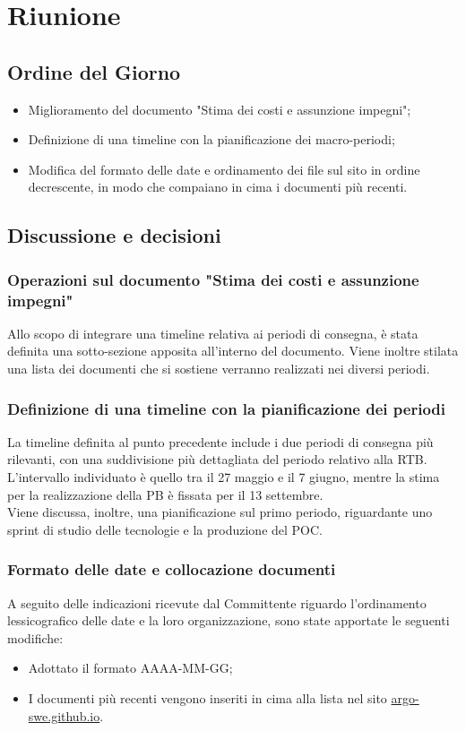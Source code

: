 \section{Riunione}
\subsection{Ordine del Giorno}
\begin{itemize}
	\item Miglioramento del documento "Stima dei costi e assunzione impegni";
	\item Definizione di una timeline con la pianificazione dei macro-periodi;
	\item Modifica del formato delle date e ordinamento dei file sul sito in ordine decrescente, in modo che compaiano in cima i documenti più recenti.
\end{itemize}

\subsection{Discussione e decisioni}

\subsubsection{Operazioni sul documento "Stima dei costi e assunzione impegni"}
Allo scopo di integrare una timeline relativa ai periodi di consegna, è stata definita una sotto-sezione apposita all’interno del documento. Viene inoltre stilata una lista dei documenti che si sostiene verranno realizzati nei diversi periodi.

\subsubsection{Definizione di una timeline con la pianificazione dei periodi}
La timeline definita al punto precedente include i due periodi di consegna più rilevanti, con una suddivisione più dettagliata del periodo relativo alla RTB. L’intervallo individuato è quello tra il 27 maggio e il 7 giugno, mentre la stima per la realizzazione della PB è fissata per il 13 settembre. \\
Viene discussa, inoltre, una pianificazione sul primo periodo, riguardante uno sprint di studio delle tecnologie e la produzione del POC.

\subsubsection{Formato delle date e collocazione documenti}
A seguito delle indicazioni ricevute dal Committente riguardo l’ordinamento lessicografico delle date e la loro organizzazione, sono state apportate le seguenti modifiche:
\begin{itemize}
	\item Adottato il formato AAAA-MM-GG;
	\item I documenti più recenti vengono inseriti in cima alla lista nel sito \href{https://argo-swe.github.io}{argo-swe.github.io}.
\end{itemize}
\clearpage
